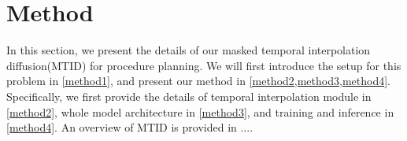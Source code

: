 \section{Method}
In this section, we present the details of our masked temporal interpolation diffusion(MTID) for procedure planning. We will first introduce the setup for this problem in \cref{method1}, and present our method in \cref{method2,method3,method4}. Specifically, we first provide the details of temporal interpolation module in \cref{method2}, whole model architecture in \cref{method3}, and training and inference in \cref{method4}. An overview of MTID is provided in ....






